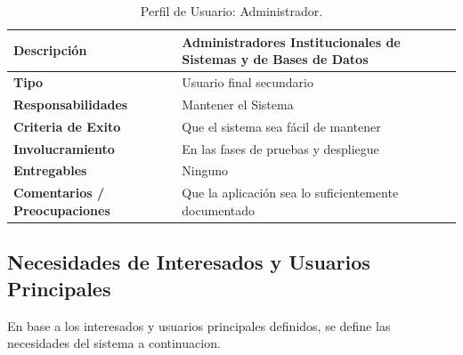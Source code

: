 \begin{table}[h!]
  \begin{tabular}{|p{}|p{}|}
    \hline
    \textbf{Descripción} & Administradores Institucionales de Sistemas y de Bases de Datos \\
    \hline
    \textbf{Tipo} & Usuario final secundario \\
    \hline
    \textbf{Responsabilidades} & Mantener el Sistema \\
    \hline
    \textbf{Criteria de Exito} & Que el sistema sea fácil de mantener \\
    \hline
    \textbf{Involucramiento} & En las fases de pruebas y despliegue \\
    \hline
    \textbf{Entregables} & Ninguno \\
    \hline
    \textbf{Comentarios / Preocupaciones} & Que la aplicación sea lo suficientemente documentado \\
    \hline
  \end{tabular}
  \caption{Perfil de Usuario: Administrador.}
  \label{per-user-admn}
\end{table}

\subsection{Necesidades de Interesados y Usuarios Principales}
En base a los interesados y usuarios principales definidos, se define las necesidades del sistema a continuacion.

